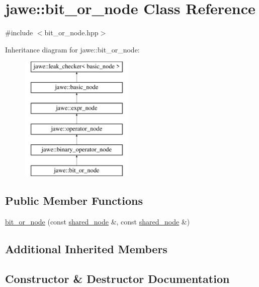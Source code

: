 \hypertarget{classjawe_1_1bit__or__node}{}\section{jawe\+:\+:bit\+\_\+or\+\_\+node Class Reference}
\label{classjawe_1_1bit__or__node}


{\ttfamily \#include $<$bit\+\_\+or\+\_\+node.\+hpp$>$}

Inheritance diagram for jawe\+:\+:bit\+\_\+or\+\_\+node\+:\begin{figure}[H]
\begin{center}
\leavevmode
\includegraphics[height=6.000000cm]{classjawe_1_1bit__or__node}
\end{center}
\end{figure}
\subsection*{Public Member Functions}
\begin{DoxyCompactItemize}
\item 
\hyperlink{classjawe_1_1bit__or__node_ad1b739037f4d4dd0a69fffc88692e569}{bit\+\_\+or\+\_\+node} (const \hyperlink{namespacejawe_a3f307481d921b6cbb50cc8511fc2b544}{shared\+\_\+node} \&, const \hyperlink{namespacejawe_a3f307481d921b6cbb50cc8511fc2b544}{shared\+\_\+node} \&)
\end{DoxyCompactItemize}
\subsection*{Additional Inherited Members}


\subsection{Constructor \& Destructor Documentation}
\mbox{\label{classjawe_1_1bit__or__node_ad1b739037f4d4dd0a69fffc88692e569}} 

